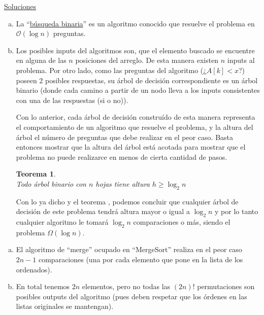 \documentclass[dcc,uchile]{fcfmcourse}
\theoremstyle{plain}
\newtheorem{teo}{Teorema}
\theoremstyle{definition}
\begin{document}
\newpage
\begin{center}
{\huge \underline{Soluciones}}
\end{center}
\begin{problems}
\begin{enumerate}[a)]
\item La ``\href{ https://en.wikipedia.org/wiki/Binary_search_algorithm }{búsqueda binaria}'' es un algoritmo conocido que resuelve el problema en $\mathcal{O} (\log n)$ preguntas. \flash
\item Los posibles inputs del algoritmos son, que el elemento buscado se encuentre en alguna de las $n$ posiciones del arreglo. De esta manera existen $n$ inputs al problema. Por otro lado, como las preguntas del algoritmo (¿$A[k]<x$?) poseen 2 posibles respuestas, su árbol de decisión correspondiente es un árbol binario (donde cada camino a partir de un nodo lleva a los inputs consistentes con una de las respuestas (si o no)).

Con lo anterior, cada árbol de decisión construído de esta manera representa el comportamiento de un algoritmo que resuelve el problema, y la altura del árbol el número de preguntas que debe realizar en el peor caso. Basta entonces mostrar que la altura del árbol está acotada para mostrar que el problema no puede realizarce en menos de cierta cantidad de pasos.\\

\begin{teo}\jewel\\
Todo árbol binario con $n$ hojas tiene altura $h \ge \log_{2} n$
\end{teo}

Con lo ya dicho y el teorema \jewel , podemos concluir que cualquier árbol de decisión de este problema tendrá altura mayor o igual a $\log_{2} n$ y por lo tanto cualquier algoritmo le tomará $\log_{2} n$ comparaciones o más, siendo el problema $\Omega (\log n)$.
\end{enumerate}
\begin{enumerate}[a)]
    \item El algoritmo de ``merge'' ocupado en ``MergeSort'' realiza en el peor caso $2n-1$ comparaciones (una por cada elemento que pone en la lista de los ordenados). \flash
    
    \item En total tenemos $2n$ elementos, pero no todas las $(2n)!$ permutaciones son posibles outputs del algoritmo (pues deben respetar que los órdenes en las listas originales se mantengan).\\    
    

\end{enumerate}
\end{problems}
\end{document}

